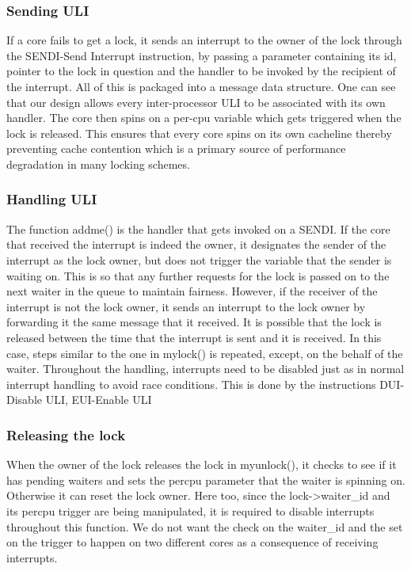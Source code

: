 \subsubsection{Sending ULI}

If a core fails to get a lock, it sends an interrupt to the owner of the lock
through the SENDI-Send Interrupt instruction, by passing a parameter containing
its id, pointer to the lock in question and the handler to be invoked by the
recipient of the interrupt. All of this is packaged into a message data
structure. One can see that our design allows every inter-processor ULI to be
associated with its own handler.  The core then spins on a per-cpu variable
which gets triggered when the lock is released. This ensures that every core
spins on its own cacheline thereby preventing cache contention which is a
primary source of performance degradation in many locking schemes.

\subsubsection{Handling ULI}

The function addme() is the handler that gets invoked on a SENDI. If the core
that received the interrupt is indeed the owner, it designates the sender of the
interrupt as the lock owner, but does not trigger the variable that the sender
is waiting on. This is so that any further requests for the lock is passed on to
the next waiter in the queue to maintain fairness. However, if the receiver of
the interrupt is not the lock owner, it sends an interrupt to the lock owner by
forwarding it the same message that it received. It is possible that the lock is
released between the time that the interrupt is sent and it is received. In this
case, steps similar to the one in mylock() is repeated, except, on the behalf of
the waiter. Throughout the handling, interrupts need to be disabled just as in
normal interrupt handling to avoid race conditions. This is done by the
instructions DUI-Disable ULI, EUI-Enable ULI

\subsubsection{Releasing the lock}

When the owner of the lock releases the lock in myunlock(), it checks to see if
it has pending waiters and sets the percpu parameter that the waiter is spinning
on. Otherwise it can reset the lock owner. Here too, since the lock->waiter\_id
and its percpu trigger are being manipulated, it is required to disable
interrupts throughout this function. We do not want the check on the waiter\_id
and the set on the trigger to happen on two different cores as a consequence of
receiving interrupts.

